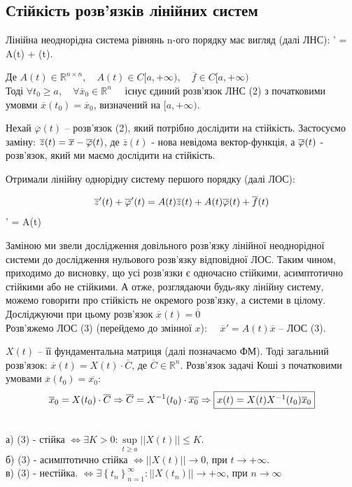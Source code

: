 \documentclass[14pt,a4paper]{scrartcl}
\theoremstyle{definition}
\theoremstyle{definition}
\theoremstyle{definition}
\begin{document}
\subsection{Стійкість розв'язків лінійних систем}
Лінійна неоднорідна система рівнянь n-ого порядку має вигляд (далі ЛНС):
\be
{}' = A(t)  +  (t).
\ee

$ \text{Де } A(t) \in \mathbb{R}^{n \times n}, \quad A(t) \in C [ a, + \infty), \quad \overline{f} \in C[a, + \infty)$ \\

Тоді $\forall t_0 \geq a, \quad \forall \overline{x}_0 \in \mathbb{R}^n \quad$ існує єдиний розв'язок ЛНС (2) з початковими умовми $\overline{x}(t_0) = \overline{x}_0$, визначений на $[a, +\infty)$.

Нехай $\overline{\varphi}(t)$ -- розв'язок (2), який потрібно дослідити на стійкість.
Застосуємо заміну: $ \overline{z} (t) = \overline{x} - \overline{\varphi} (t)$, де $ \overline{z}(t)$ - нова невідома вектор-функція, а $\overline{\varphi} (t)$ - розв'язок, який ми маємо дослідити на стійкість.

Отримали лінійну однорідну систему першого порядку (далі ЛОС):

$$ \overline{z}'(t)   + \overline{\varphi}'(t) = A(t)\overline{z}(t) + A(t)\overline{\varphi}(t) + \overline{f}(t) $$
\be
{}' = A(t)  
\ee

Заміною ми звели дослідження довільного розв'язку лінійної неоднорідної системи до дослідження нульового розв'язку відповідної ЛОС. Таким чином, приходимо до висновку, що усі розв'язки є одночасно стійкими, асимптотично стійкими або не стійкими. А отже, розглядаючи будь-яку лінійну систему, можемо говорити про стійкість не окремого розв'язку, а системи в цілому. Досліджуючи при цьому розв'язок $\overline{x}(t) = \overline{0}$\\

Розв'яжемо ЛОС (3) (перейдемо до змінної $x$): $\quad \overline{x}'  =  A(t) \overline{x} $ -- ЛОС (3).

$X(t) $ -- її фундаментальна матриця (далі позначаємо ФМ). Тоді загальний розв'язок: $ \overline{x} (t) = X(t) \cdot \overline{C}$, де $\overline{ C} \in \mathbb{R}^n$.
Розв'язок задачі Коші з початковими умовами $ \overline{x} (t_0) = \overline{x_0}$:
$$
\overline{x}_0 = X(t_0) \cdot \overline{C} \Rightarrow \overline{C} = X^{-1} (t_0) \cdot \overline{x_0} \Rightarrow \fbox{$x(t) = X(t) X^{-1}(t_0) \overline{x}_0$}
$$

\begin{spacing}{2.5}
  \begin{boxteo}\quad \\
  а) (3) - стійка $\Longleftrightarrow \exists K > 0: \sup\limits_{t\geq  a} ||X(t) || \leq K$.\\
  б) (3) - асимптотично стійка $\Longleftrightarrow  ||X(t)|| \to 0 $, при $ t \to +\infty$.\\
  в) (3) - нестійка. $ \Longleftrightarrow \exists \left\lbrace t_n \right\rbrace_{n=1}^{\infty} : ||X(t_n)|| \to +\infty $, при $n \to \infty$
  \end{boxteo}
\end{spacing}
\end{document}
